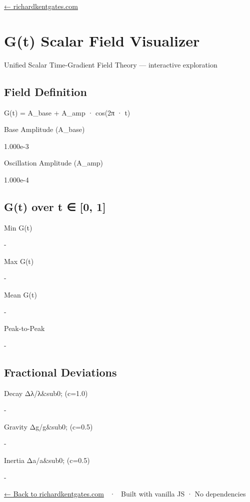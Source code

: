 \documentclass[
  10pt,
]{article}
\author{}
\date{}
\begin{document}
\href{https://richardkentgates.com}{← richardkentgates.com}

\hypertarget{gt-scalar-field-visualizer}{%
\section{G(t) Scalar Field
Visualizer}\label{gt-scalar-field-visualizer}}

Unified Scalar Time-Gradient Field Theory --- interactive exploration

\hypertarget{field-definition}{%
\subsection{Field Definition}\label{field-definition}}

G(t) = A\_base + A\_amp · cos(2π · t)

Base Amplitude (A\_base)

\protect\hypertarget{base-val}{}{1.000e-3}

Oscillation Amplitude (A\_amp)

\protect\hypertarget{amp-val}{}{1.000e-4}

\hypertarget{gt-over-t-0-1}{%
\subsection{G(t) over t ∈ {[}0, 1{]}}\label{gt-over-t-0-1}}

Min G(t)

\hypertarget{s-min}{}
-

Max G(t)

\hypertarget{s-max}{}
-

Mean G(t)

\hypertarget{s-mean}{}
-

Peak-to-Peak

\hypertarget{s-p2p}{}
-

\hypertarget{fractional-deviations}{%
\subsection{Fractional Deviations}\label{fractional-deviations}}

Decay Δλ/λ\&sub0; (c=1.0)

\hypertarget{d-decay}{}
-

Gravity Δg/g\&sub0; (c=0.5)

\hypertarget{d-grav}{}
-

Inertia Δa/a\&sub0; (c=0.5)

\hypertarget{d-iner}{}
-

\href{https://richardkentgates.com}{← Back to richardkentgates.com} ~·~
Built with vanilla JS · No dependencies
\end{document}
